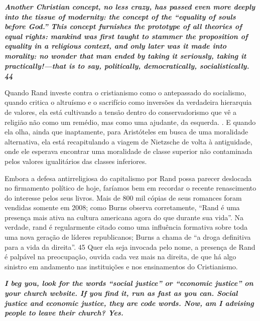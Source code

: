  \textbf{\textit{Another Christian concept, no less crazy, has passed even more deeply into the tissue of modernity: the concept of the “equality of souls before God.” This concept furnishes the prototype of all theories of equal rights: mankind was first taught to stammer the proposition of equality in a religious context, and only later was it made into morality: no wonder that man ended by taking it seriously, taking it practically!—that is to say, politically, democratically, socialistically. {{\color{blue} 44} } } }  
 
 
\par
 
Quando Rand investe contra o cristianismo como o antepassado do socialismo, quando critica o altruísmo e o sacrifício como inversões da verdadeira hierarquia de valores, ela está cultivando a tensão dentro do conservadorismo que vê a religião não como um remédio, mas como uma ajudante, da esquerda. . E quando ela olha, ainda que inaptamente, para Aristóteles em busca de uma moralidade alternativa, ela está recapitulando a viagem de Nietzsche de volta à antiguidade, onde ele esperava encontrar uma moralidade de classe superior não contaminada pelos valores igualitários das classes inferiores.
 
\par
 
Embora a defesa antirreligiosa do capitalismo por Rand possa parecer deslocada no firmamento político de hoje, faríamos bem em recordar o recente renascimento do interesse pelos seus livros. Mais de 800 mil cópias de seus romances foram vendidas somente em 2008; como Burns observa corretamente, “Rand é uma presença mais ativa na cultura americana agora do que durante sua vida”. Na verdade, rand é regularmente citado como uma influência formativa sobre toda uma nova geração de líderes republicanos; Burns a chama de “a droga definitiva para a vida da direita”.
 {\color{blue} 45}  
Quer ela seja invocada pelo nome, a presença de Rand é palpável na preocupação, ouvida cada vez mais na direita, de que há algo sinistro em andamento nas instituições e nos ensinamentos do Cristianismo.
 
\par
 

 \textbf{\textit{I beg you, look for the words “social justice” or “economic justice” on your church website. If you find it, run as fast as you can. Social justice and economic justice, they are code words. Now, am I advising people to leave their church? Yes.} }  
 
